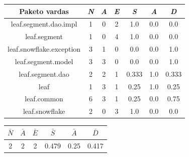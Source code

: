 \begin{center}
    \begin{tabular}{|c|c|c|c|c|c|c|}
        \hline
        Paketo vardas & \textit{N} & \textit{A} & \textit{E} & \textit{S} & \textit{A} & \textit{D} \\ [0.5ex]
        \hline\hline
        leaf.segment.dao.impl & 1 & 0 & 2 & 1.0 & 0.0 & 0.0 \\
        \hline
        leaf.segment & 1 & 0 & 4 & 1.0 & 0.0 & 0.0 \\
        \hline
        leaf.snowflake.exception & 3 & 1 & 0 & 0.0 & 0.0 & 1.0 \\
        \hline
        leaf.segment.model & 3 & 3 & 0 & 0.0 & 0.0 & 1.0 \\
        \hline
        leaf.segment.dao & 2 & 2 & 1 & 0.333 & 1.0 & 0.333 \\
        \hline
        leaf & 1 & 3 & 1 & 0.25 & 1.0 & 0.25 \\
        \hline
        leaf.common & 6 & 3 & 1 & 0.25 & 0.0 & 0.75 \\
        \hline
        leaf.snowflake & 2 & 0 & 3 & 1.0 & 0.0 & 0.0 \\
        \hline
    \end{tabular}
    \begin{tabular}{|c|c|c|c|c|c|}
        \hline
        $\bar{N}$ & $\bar{A}$ & $\bar{E}$ & $\bar{S}$ & $\bar{A}$ & $\bar{D}$ \\ [0.5ex]
        \hline\hline
        2 & 2 & 2 & 0.479 & 0.25 & 0.417 \\
        \hline
    \end{tabular}
\end{center}
